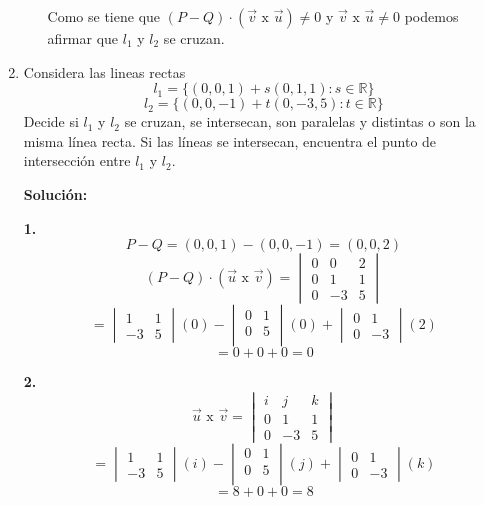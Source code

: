 \documentclass{article}
\begin{document}
\begin{enumerate}
\begin{itemize}
        Como se tiene que $(P-Q) \cdot (\vec{v} \text{ x } \vec{u})\neq 0$ y $\vec{v}\text{ x } \vec{u}\neq 0$ podemos afirmar 
        que $l_1$ y $l_2$ se cruzan.
    \end{itemize}

    \item Considera las lineas rectas $$l_1 = \{(0,0,1)+ s(0,1,1): s \in \mathbb{R}\}$$ 
    $$l_2 = \{(0,0,-1)+ t(0,-3,5): t \in \mathbb{R}\}$$ 
    Decide si $l_1$ y $l_2$ se cruzan, se intersecan, son paralelas y distintas o son la misma línea recta. 
    Si las líneas se intersecan, encuentra el punto de intersección entre $l_1$ y $l_2$.
    \vspace{10pt}

    \textbf{Solución:}
    \vspace{10pt} 
    \begin{minipage}[c]{0.5cm}
        \textbf{1.}
        $$P- Q =(0,0,1)-(0,0,-1) =(0,0,2)$$
        $$(P-Q) \cdot (\vec{u}\text{ x } \vec{v})= \begin{vmatrix}
            0 & 0 & 2 \\
            0 & 1 & 1 \\
            0 & -3 & 5
        \end{vmatrix}$$
        $$ = \begin{vmatrix}
            1 & 1 \\
            -3 & 5
        \end{vmatrix}(0) - \begin{vmatrix}
            0 & 1 \\
            0 & 5 \\
        \end{vmatrix}(0) + \begin{vmatrix}
            0 & 1 \\
            0 & -3 
        \end{vmatrix}(2)$$
        $$ = 0+0+0 = 0$$
    \end{minipage}\hspace*{7cm}\begin{minipage}[c]{0.5cm}
        \textbf{2.}
        $$\vec{u}\text{ x }\vec{v} = \begin{vmatrix}
            i & j & k \\
            0 & 1 & 1 \\
            0 & -3 & 5
        \end{vmatrix}$$
        $$ = \begin{vmatrix}
            1 & 1 \\
            -3 & 5
        \end{vmatrix}(i) - \begin{vmatrix}
            0 & 1 \\
            0 & 5 \\
        \end{vmatrix}(j) + \begin{vmatrix}
            0 & 1 \\
            0 & -3 
        \end{vmatrix}(k)$$
        $$ = 8+0+0 = 8$$
    \end{minipage}


\end{enumerate}
\end{document}
